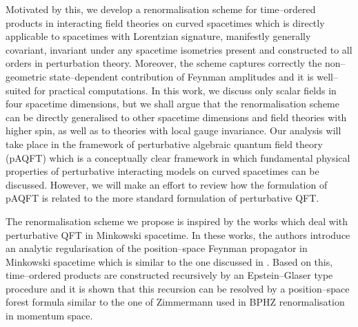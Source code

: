 \documentclass[a4paper,10pt,twoside]{article}
\numberwithin{equation}{section}
\newcounter{and}
\theoremstyle{plain}
\theoremstyle{definition}
\begin{document}
Motivated by this, we develop a renormalisation scheme for time--ordered products in interacting field theories on curved spacetimes which is directly applicable to spacetimes with Lorentzian signature, manifestly generally covariant, invariant under any spacetime isometries present and constructed to all orders in perturbation theory. Moreover, the scheme captures correctly the non--geometric state--dependent contribution of Feynman amplitudes and it is well--suited for practical computations. In this work, we discuss only scalar fields in four spacetime dimensions, but we shall argue that the renormalisation scheme can be directly generalised to other spacetime dimensions and field theories with higher spin, as well as to theories with local gauge invariance. Our analysis will take place in the framework of perturbative algebraic quantum field theory (pAQFT) \cite{Brunetti-Fredenhagen:2000, Hollands:2001nf, Hollands:2004yh, BDF,FredenhagenRejzner,FredenhagenRejzner2} which is a conceptually clear framework in which fundamental physical properties of perturbative interacting models on curved spacetimes can be discussed. However, we will make an effort to review how the formulation of pAQFT is related to the more standard formulation of perturbative QFT.

The renormalisation scheme we propose is inspired by the works \cite{Keller,dfkr} which deal with perturbative QFT in Minkowski spacetime. In these works, the authors introduce an analytic regularisation of the position--space Feynman propagator in Minkowski spacetime which is similar to the one discussed in \cite{BolliniGiambiagi}. Based on this, time--ordered products are constructed recursively by an Epstein--Glaser type procedure and it is shown that this recursion can be resolved by a position--space forest formula similar to the one of Zimmermann used in BPHZ renormalisation in momentum space. 
\end{document}
